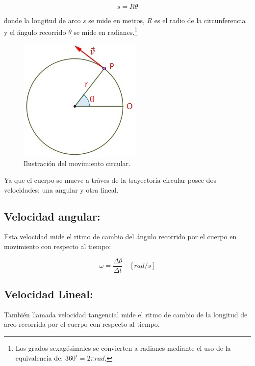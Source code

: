 \documentclass[a5paper,pagesize,10pt,bibtotoc,pointlessnumbers,
normalheadings,DIV=9,fleqn,x11names,table,twoside=false]{scrbook}
\begin{document}
\begin{equation}
 s = R\theta
\end{equation}

donde la longitud de arco $s$ se mide en metros, $R$ es el radio de la circunferencia y el ángulo recorrido $\theta$ se mide en 
radianes.\footnote{Los grados sexagésimales se convierten a radianes mediante el uso de la equivalencia de: $360^\circ = 2\pi 
rad$.}

\begin{figure}[ht]
 \centering
 \includegraphics[scale=0.6]{images/movimiento-circular.jpg}
 \caption{Ilustración del movimiento circular.}\label{circular}
\end{figure}   

Ya que el cuerpo se mueve a tráves de la trayectoria circular posee dos velocidades: una angular y otra lineal.\\

\subsection{Velocidad angular:}

Esta velocidad mide el ritmo de cambio del ángulo recorrido por el cuerpo en movimiento con respecto al tiempo:

\begin{equation}
\omega = \frac{\Delta \theta}{\Delta t} \quad [rad/s]
\end{equation}

\subsection{Velocidad Lineal:}

También llamada velocidad tangencial mide el ritmo de cambio de la longitud de arco recorrida por el cuerpo con respecto al 
tiempo.
\end{document}
